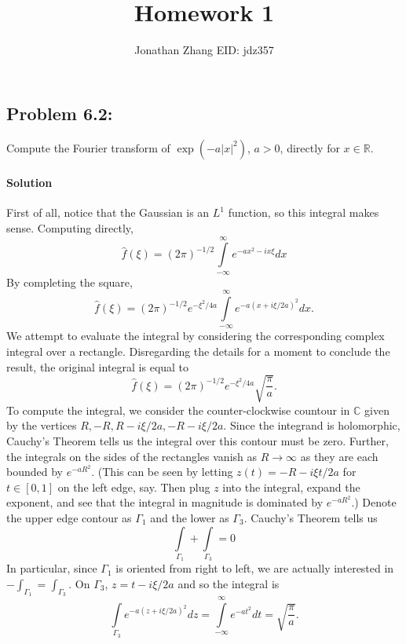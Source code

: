 \documentclass[letterpaper,twoside,11pt]{article}
\theoremstyle{mystyle}
\newcommand{\R}{{\mathbb R}}
\newcommand{\C}{{\mathbb C}}
\begin{document}
\title{\vspace{-2\baselineskip} 
Homework 1
}
\author{Jonathan Zhang \qquad EID: { jdz357} }
\date{}
\maketitle


\subsection*{Problem 6.2:}
Compute the Fourier transform of $\exp\left( -a| x| ^2 \right)$, $a>0$, directly for $x\in \R$.

\paragraph*{Solution} 
First of all, notice that the Gaussian is an $L^1$ function, so this integral makes sense. 
Computing directly,
\[\hat f \left( \xi \right) = \left( 2\pi \right)^{-1/2}\int\limits_{-\infty}^\infty e^{-ax^2 -ix\xi } dx  \]
By completing the square, 
\[\hat f \left( \xi \right) = \left( 2\pi \right)^{-1/2}e^{-\xi^2/4a}\int\limits_{-\infty}^\infty e^{-a\left( x+i\xi/2a  \right)^2 } dx.\]
We attempt to evaluate the integral by considering the corresponding complex integral over a rectangle. 
Disregarding the details for a moment to conclude the result, the original integral is equal to
\[\hat f \left( \xi \right) = \left( 2\pi \right)^{-1/2} e^{-\xi^2/4a} \sqrt{\frac{\pi}{a}}.\]
To compute the integral, we consider the counter-clockwise countour in $\C$ given by the vertices $R, -R, R-i\xi/2a, -R-i\xi/2a$. Since the integrand is holomorphic, Cauchy's Theorem tells us the integral over this contour must be zero. Further, the integrals on the sides of the rectangles vanish as $R\to\infty$ as they are each bounded by $e^{-aR^2}$. (This can be seen by letting $z(t) = -R - i\xi t/2a$ for $t \in [0,1]$ on the left edge, say. Then plug $z$ into the integral, expand the exponent, and see that the integral in magnitude is dominated by $e^{-aR^2}$.) Denote the upper edge contour as $\Gamma_1$ and the lower as $\Gamma_3$. Cauchy's Theorem tells us 
\[\int\limits_{\Gamma_1} + \int\limits_{\Gamma_3}=0\]
In particular, since $\Gamma_1$ is oriented from right to left, we are actually interested in $-\int_{\Gamma_1} = \int_{\Gamma_3}$. On $\Gamma_3$, $z = t - i\xi/2a$ and so the integral is 
\[\int\limits_{\Gamma_3} e^{-a\left( z+i\xi/2a  \right)^2 } dz=\int\limits_{-\infty}^{\infty}e^{-at^2}dt=\sqrt{\frac{\pi}{a}}.\]
\end{document}
